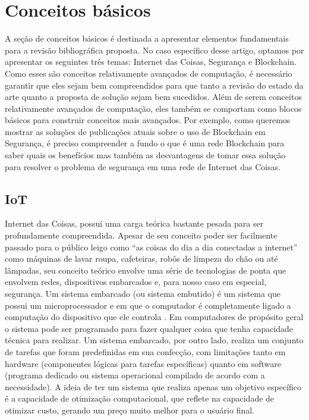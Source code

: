 
\section{Conceitos básicos}

A seção de conceitos básicos é destinada a apresentar elementos fundamentais para a revisão bibliográfica proposta. No caso específico desse artigo, optamos por apresentar os seguintes três temas: Internet das Coisas, Segurança e Blockchain. Como esses são conceitos relativamente avançados de computação, é necessário garantir que eles sejam bem compreendidos para que tanto a revisão do estado da arte quanto a proposta de solução sejam bem sucedidos. Além de serem conceitos relativamente avançados de computação, eles também se comportam como blocos básicos para construir conceitos mais avançados. Por exemplo, como queremos mostrar as soluções de publicações atuais sobre o uso de Blockchain em Segurança, é preciso compreender a fundo o que é uma rede Blockchain para saber quais os benefícios mas também as desvantagens de tomar essa solução para resolver o problema de segurança em uma rede de Internet das Coisas.

\subsection{IoT}


Internet das Coisas, possuí uma carga teórica bastante pesada para ser profundamente compreendida. Apesar de seu conceito poder ser facilmente passado para o público leigo como ``as coisas do dia a dia conectadas a internet'' como máquinas de lavar roupa, cafeteiras, robôs de limpeza do chão ou até lâmpadas, seu conceito teórico envolve uma série de tecnologias de ponta que envolvem redes, dispositivos embarcados e, para nosso caso em especial, segurança. Um sistema embarcado (ou sistema embutido) é um sistema que possui um microprocessador e em que o computador é completamente ligado a computação do dispositivo que ele controla \cite{ganssle2003embedded}. Em computadores de propósito geral o sistema pode ser programado para fazer qualquer coisa que tenha capacidade técnica para realizar. Um sistema embarcado, por outro lado, realiza um conjunto de tarefas que foram predefinidas em sua confecção, com limitações tanto em hardware (componentes lógicas para tarefas específicas) quanto em software (programa dedicado ou sistema operacional compilado de acordo com a necessidade). A ideia de ter um sistema que realiza apenas um objetivo específico é a capacidade de otimização computacional, que reflete na capacidade de otimizar custo, gerando um preço muito melhor para o usuário final.

